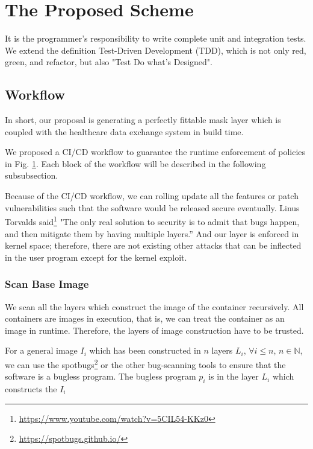 \section{The Proposed Scheme}
It is the programmer's responsibility to write complete unit and integration tests.
We extend the definition Test-Driven Development (TDD), which is not only red,
green, and refactor, but also "Test Do what's Designed".

\subsection{Workflow}
In short, our proposal is generating a perfectly fittable mask layer which
is coupled with the healthcare data exchange system in build time.

\begin{figure}[h]
    \centering
    \label{workflow}
\end{figure}

We proposed a CI/CD workflow to guarantee the runtime enforcement of policies
in Fig. \ref{workflow}. Each block of the workflow will be described
in the following subsubsection.

Because of the CI/CD workflow, we can rolling update all the features or
patch vulnerabilities such that the software would be released secure
eventually. Linus Torvalds said\footnote{\url{https://www.youtube.com/watch?v=5CIL54-KKz0}}
"The only real solution to security is to admit that bugs happen, and
then mitigate them by having multiple layers.” And our layer is enforced
in kernel space; therefore, there are not existing other attacks that can
be inflected in the user program except for the kernel exploit.


\subsubsection{Scan Base Image}
We scan all the layers which construct the image of the container recursively.
All containers are images in execution, that is, we can treat the container
as an image in runtime. Therefore, the layers of image construction have to
be trusted.

For a general image $I_i$ which has been constructed in $n$ layers $L_i$,
$\forall i \le n$, $n \in \mathbb{N}$, we can use the spotbugs\footnote{\url{https://spotbugs.github.io/}}
or the other bug-scanning tools to ensure that the software is a bugless program.
The bugless program $p_i$ is in the layer $L_i$ which constructs the $I_i$

